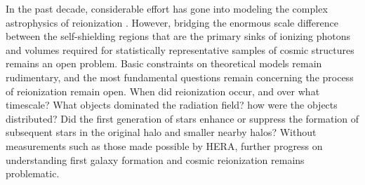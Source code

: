 \documentclass[preprint]{aastex}
\begin{document}
In the past decade, considerable effort has gone into modeling the complex astrophysics
of reionization
\citep{santos_et_al2010,mesinger_et_al2011,wyithe_loeb2004}. However, bridging the
enormous scale difference between the self-shielding regions that are the
primary sinks of ionizing photons and volumes required for statistically
representative samples of cosmic structures remains an open problem.  
Basic constraints on theoretical models remain rudimentary, and the most
fundamental questions remain concerning the process of reionization remain open. 
When did
reionization occur, and over what timescale?  What objects dominated the
radiation field? how were the objects distributed? Did the first generation of
stars enhance or suppress the formation of subsequent stars in the original
halo and smaller nearby halos? Without measurements such as those made possible by HERA,
further progress on understanding first galaxy formation and
cosmic reionization remains problematic. 

\end{document}
